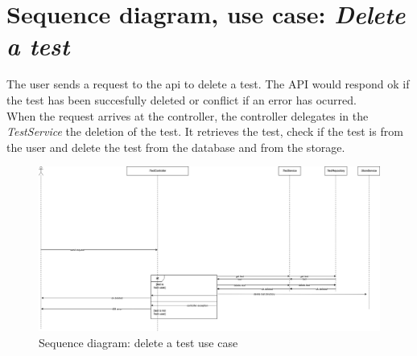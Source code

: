     \section{Sequence diagram, use case: \textit{Delete a test}}
    The user sends a request to the api to delete a test. The API would respond ok if the test has been succesfully deleted or conflict if an error has ocurred. \\
    When the request arrives at the controller, the controller delegates in the \textit{TestService} the deletion of the test. It retrieves the test, check if the test is from the user and delete the test from the database and from the storage. \\
        \begin{figure}[H]
            \centering
                \includegraphics[width=\textwidth]{assets/diagrams/deletetest.png}
            \caption{Sequence diagram: delete a test use case}
            \label{fig:implementation_deletetest}
        \end{figure}

